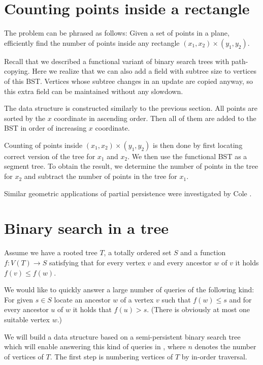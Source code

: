 \section{Counting points inside a rectangle}

The problem can be phrased as follows: Given a set of points in a plane, efficiently find the number of points inside any rectangle $(x_1, x_2) \times (y_1, y_2)$.

Recall that we described a functional variant of binary search trees with path-copying. 
Here we realize that we can also add a field with subtree size to vertices of this BST. 
Vertices whose subtree changes in an update are copied anyway, so this extra field can be maintained without any slowdown. 

The data structure is constructed similarly to the previous section. 
All points are sorted by the $x$ coordinate in ascending order. 
Then all of them are added to the BST in order of increasing $x$ coordinate.

Counting of points inside $(x_1, x_2) \times (y_1, y_2)$ is then done by first locating correct version of the tree for $x_1$ and $x_2$. 
We then use the functional BST as a segment tree. 
To obtain the result, we determine the number of points in the tree for $x_2$ and subtract the number of points in the tree for $x_1$.

Similar geometric applications of partial persistence were investigated by Cole \cite{geometric-applications}.

\section{Binary search in a tree}

Assume we have a rooted tree $T$, a totally ordered set $S$ and a function $f: V(T) \rightarrow S$ satisfying that for every vertex $v$ and every ancestor $w$ of $v$ it holds $f(v) \leq f(w)$. 


We would like to quickly answer a large number of queries of the following kind: For given $s \in S$ locate an ancestor $w$ of a vertex $v$ such that $f(w) \leq s$ and for every ancestor $u$ of $w$ it holds that $f(u) > s$. (There is obviously at most one suitable vertex $w$.)

We will build a data structure based on a semi-persistent binary search tree which will enable answering this kind of queries in , where $n$ denotes the number of vertices of $T$. The first step is numbering vertices of $T$ by in-order traversal. 


